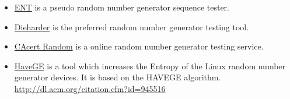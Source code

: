 \begin{itemize}
\item \href{http://www.fourmilab.ch/random/}{ENT} is a pseudo random number generator sequence tester.  
\item \href{http://www.phy.duke.edu/~rgb/General/dieharder.php}{Dieharder} is the preferred random number generator testing tool.
\item \href{http://www.cacert.at/random/}{CAcert Random} is a online random number generator testing service.
\item \href{http://www.issihosts.com/haveged/}{HaveGE} is a tool which increases the Entropy of the Linux random number generator devices. It is based on the HAVEGE algorithm. \url{http://dl.acm.org/citation.cfm?id=945516}
\end{itemize}



